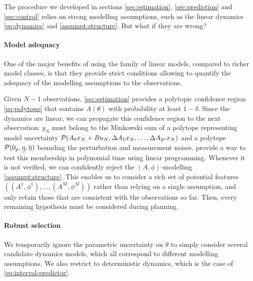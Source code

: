 \documentclass{article}
\begin{document}
The procedure we developed in sections \ref{sec:estimation}, \ref{sec:prediction} and \ref{sec:control} relies on strong modelling assumptions, such as the linear dynamics \eqref{eq:dynamics} and \autoref{assumpt:structure}. But what if they are wrong?

\paragraph{Model adequacy}

One of the major benefits of using the family of linear models, compared to richer model classes, is that they provide strict conditions allowing to quantify the adequacy of the modelling assumptions to the observations.

Given $N-1$ observations, \autoref{sec:estimation} provides a polytopic confidence region \eqref{eq:polytope} that contains $A(\theta)$ with probability at least $1-\delta$. Since the dynamics are linear, we can propagate this confidence region to the next observation: $y_{N}$ must belong to the Minkowski sum of a polytope representing model uncertainty $\mathcal{P}(A_{0} x_N + Bu_N, \Delta A_{1}x_N,\dots, \Delta A_{2^d}x_N)$ and a polytope $\mathcal{P}(0_p, \underline{\eta}, \overline{\eta})$ bounding the perturbation and measurement noises. \citet{delos2015} provide a way to test this membership in polynomial time using linear programming. Whenever it is not verified, we can confidently reject the $(A,\phi)$-modelling \autoref{assumpt:structure}. This enables us to consider a rich set of potential features $\left((A^1, \phi^1), \dots, (A^M, \phi^M)\right)$ rather than relying on a single assumption, and only retain those that are consistent with the observations so far. Then, every remaining hypothesis must be considered during planning.

\paragraph{Robust selection}

We temporarily ignore the parametric uncertainty on $\theta$ to simply consider several candidate dynamics models, which all correspond to different modelling assumptions. We also restrict to deterministic dynamics, which is the case of \eqref{eq:interval-predictor}.
\end{document}
